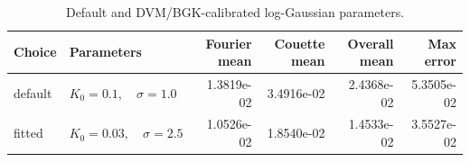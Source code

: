 \begin{table}[htbp]
\centering
\caption{Default and DVM/BGK-calibrated log-Gaussian parameters.}
\label{tab:default_vs_fitted}
\begin{tabular}{llrrrr}
\hline
Choice & Parameters & Fourier mean & Couette mean & Overall mean & Max error \\
\hline
default & $K_0=0.1,\quad \sigma=1.0$ & 1.3819e-02 & 3.4916e-02 & 2.4368e-02 & 5.3505e-02 \\
fitted & $K_0=0.03,\quad \sigma=2.5$ & 1.0526e-02 & 1.8540e-02 & 1.4533e-02 & 3.5527e-02 \\
\hline
\end{tabular}
\end{table}
